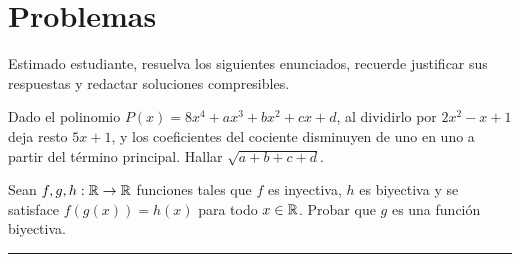 \section*{Problemas}

Estimado estudiante, resuelva los siguientes enunciados, recuerde justificar sus respuestas y redactar soluciones compresibles.

\begin{exercise*}
    Dado el polinomio $P(x) = 8x^4 + ax^3 + bx^2 + cx + d$, al dividirlo por $2x^2 - x + 1$ deja resto $5x + 1$, y los coeficientes
    del cociente disminuyen de uno en uno a partir del término principal.
    Hallar $\sqrt {a + b + c +d}$.
\end{exercise*}

\begin{exercise*}
    Sean $f,g,h : \mathbb{R} \to \mathbb{R}$ funciones tales que $f$ es inyectiva, $h$ es biyectiva y se satisface $f(g(x)) = h(x)$ para todo $x \in \mathbb{R}$.
    Probar que $g$ es una función biyectiva.
\end{exercise*}

\begin{problem*}
\end{problem*}

\hrule